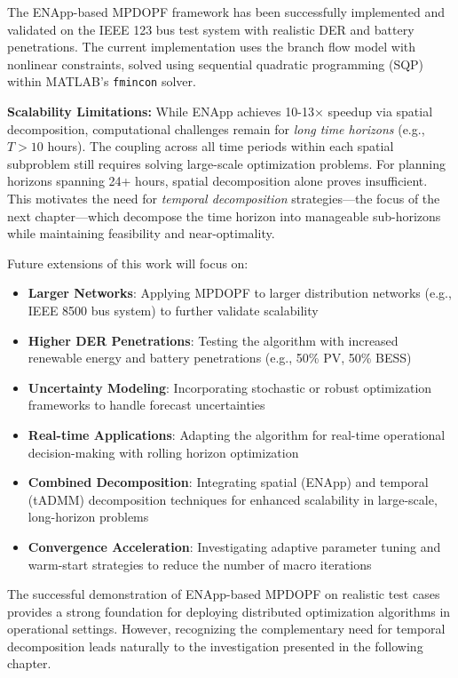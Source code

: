 The ENApp-based MPDOPF framework has been successfully implemented and validated on the IEEE 123 bus test system with realistic DER and battery penetrations. The current implementation uses the branch flow model with nonlinear constraints, solved using sequential quadratic programming (SQP) within MATLAB's \texttt{fmincon} solver.

\textbf{Scalability Limitations:} While ENApp achieves 10-13× speedup via spatial decomposition, computational challenges remain for \textit{long time horizons} (e.g., $T > 10$ hours). The coupling across all time periods within each spatial subproblem still requires solving large-scale optimization problems. For planning horizons spanning 24+ hours, spatial decomposition alone proves insufficient. This motivates the need for \textit{temporal decomposition} strategies—the focus of the next chapter—which decompose the time horizon into manageable sub-horizons while maintaining feasibility and near-optimality.

Future extensions of this work will focus on:

\begin{itemize}
    \item \textbf{Larger Networks}: Applying MPDOPF to larger distribution networks (e.g., IEEE 8500 bus system) to further validate scalability
    \item \textbf{Higher DER Penetrations}: Testing the algorithm with increased renewable energy and battery penetrations (e.g., 50\% PV, 50\% BESS)
    \item \textbf{Uncertainty Modeling}: Incorporating stochastic or robust optimization frameworks to handle forecast uncertainties
    \item \textbf{Real-time Applications}: Adapting the algorithm for real-time operational decision-making with rolling horizon optimization
    \item \textbf{Combined Decomposition}: Integrating spatial (ENApp) and temporal (tADMM) decomposition techniques for enhanced scalability in large-scale, long-horizon problems
    \item \textbf{Convergence Acceleration}: Investigating adaptive parameter tuning and warm-start strategies to reduce the number of macro iterations
\end{itemize}

The successful demonstration of ENApp-based MPDOPF on realistic test cases provides a strong foundation for deploying distributed optimization algorithms in operational settings. However, recognizing the complementary need for temporal decomposition leads naturally to the investigation presented in the following chapter.
